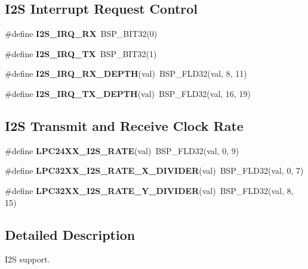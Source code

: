 \subsection*{I2S Interrupt Request Control}
\begin{DoxyCompactItemize}
\item 
\mbox{\label{group__lpc__i2s_ga836d0b4ac7d6b8bf36806a1eece49b32}} 
\#define {\bfseries I2\+S\+\_\+\+I\+R\+Q\+\_\+\+RX}~B\+S\+P\+\_\+\+B\+I\+T32(0)
\item 
\mbox{\label{group__lpc__i2s_ga5a7a4b96cc3ec88135781113f7747542}} 
\#define {\bfseries I2\+S\+\_\+\+I\+R\+Q\+\_\+\+TX}~B\+S\+P\+\_\+\+B\+I\+T32(1)
\item 
\mbox{\label{group__lpc__i2s_ga8225671b2f54d13917c0f67a4f9b2038}} 
\#define {\bfseries I2\+S\+\_\+\+I\+R\+Q\+\_\+\+R\+X\+\_\+\+D\+E\+P\+TH}(val)~B\+S\+P\+\_\+\+F\+L\+D32(val, 8, 11)
\item 
\mbox{\label{group__lpc__i2s_gafc55101adb2d5d102abc72e87f0c3af1}} 
\#define {\bfseries I2\+S\+\_\+\+I\+R\+Q\+\_\+\+T\+X\+\_\+\+D\+E\+P\+TH}(val)~B\+S\+P\+\_\+\+F\+L\+D32(val, 16, 19)
\end{DoxyCompactItemize}
\subsection*{I2S Transmit and Receive Clock Rate}
\begin{DoxyCompactItemize}
\item 
\mbox{\label{group__lpc__i2s_ga8f58a2dec8135092ea04947a9bcd1d97}} 
\#define {\bfseries L\+P\+C24\+X\+X\+\_\+\+I2\+S\+\_\+\+R\+A\+TE}(val)~B\+S\+P\+\_\+\+F\+L\+D32(val, 0, 9)
\item 
\mbox{\label{group__lpc__i2s_ga9ef1b631caea5fbc638e3e0a806f48e0}} 
\#define {\bfseries L\+P\+C32\+X\+X\+\_\+\+I2\+S\+\_\+\+R\+A\+T\+E\+\_\+\+X\+\_\+\+D\+I\+V\+I\+D\+ER}(val)~B\+S\+P\+\_\+\+F\+L\+D32(val, 0, 7)
\item 
\mbox{\label{group__lpc__i2s_ga5a57a7155bcd6685e401d24b587df3a8}} 
\#define {\bfseries L\+P\+C32\+X\+X\+\_\+\+I2\+S\+\_\+\+R\+A\+T\+E\+\_\+\+Y\+\_\+\+D\+I\+V\+I\+D\+ER}(val)~B\+S\+P\+\_\+\+F\+L\+D32(val, 8, 15)
\end{DoxyCompactItemize}


\subsection{Detailed Description}
I2S support. 


